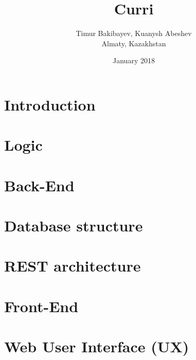 \documentclass[a4paper]{article}
\begin{document}
\title{Curri}

\author{Timur Bakibayev, Kuanysh Abeshev \\ {\small Almaty, Kazakhstan} }

\date{January 2018}

\maketitle

\section{Introduction}



\section{Logic}



\section{Back-End}

\section{Database structure}



\section{REST architecture}



\section{Front-End}

\section{Web User Interface (UX)}


\end{document}
